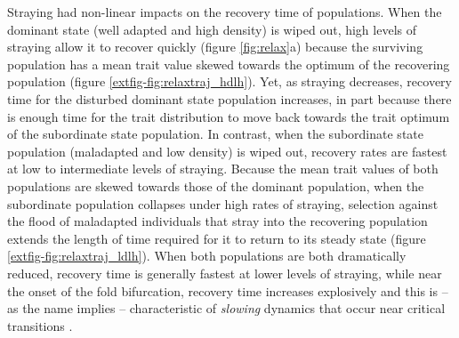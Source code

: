 \documentclass{revtex4}
\begin{document}
Straying had non-linear impacts on the recovery time of populations. 
When the dominant state (well adapted and high density) is wiped out, high levels of straying allow it to recover quickly (figure \ref{fig:relax}a) because the surviving population has a mean trait value skewed towards the optimum of the recovering population (figure \ref{extfig-fig:relaxtraj_hdlh}).
Yet, as straying decreases, recovery time for the disturbed dominant state population increases, in part because there is enough time for the trait distribution to move back towards the trait optimum of the subordinate state population.
In contrast, when the subordinate state population (maladapted and low density) is wiped out, recovery rates are fastest at low to intermediate levels of straying.
Because the mean trait values of both populations are skewed towards those of the dominant population, when the subordinate population collapses under high rates of straying, selection against the flood of maladapted individuals that stray into the recovering population extends the length of time required for it to return to its steady state (figure \ref{extfig-fig:relaxtraj_ldlh}).
When both populations are both dramatically reduced, recovery time is generally fastest at lower levels of straying, while near the onset of the fold bifurcation, recovery time increases explosively and this is -- as the name implies -- characteristic of \emph{slowing} dynamics that occur near critical transitions \citep{Scheffer:2009gg,Kuehn:2010p2591}.\\
\end{document}
